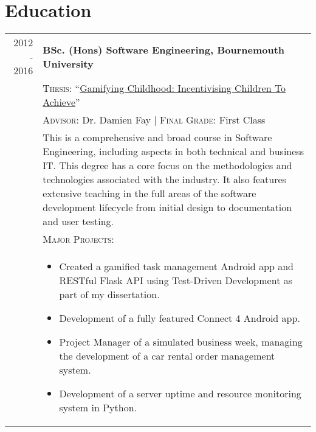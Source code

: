 \section{Education}
\begin{tabular}{r|p{11cm}}
	2012 - 2016 & \textbf{BSc. (Hons) Software Engineering, Bournemouth University}\\ 
	& \textsc{Thesis}: ``\href{https://github.com/mikeporterdev/Dissertation/blob/master/digitalmain.pdf}{Gamifying Childhood: Incentivising Children To Achieve}'' \\
	& \textsc{Advisor}: Dr. Damien Fay | \normalsize \textsc{Final Grade}: First Class \\
	& \small This is a comprehensive and broad course in Software Engineering, including aspects in both technical and business IT. This degree has a core focus on the methodologies and technologies associated with the industry. It also features extensive teaching in the full areas of the software development lifecycle from initial design to documentation and user testing. \\
	& \vspace{1pt} \textsc{Major Projects}: \\
	& \vspace{-0.9em}\begin{itemize}[itemsep=0pt,topsep=0pt,leftmargin=*]\small
	\item Created a gamified task management Android app and RESTful Flask API using Test-Driven Development as part of my dissertation.
	\item Development of a fully featured Connect 4 Android app. 
	\item Project Manager of a simulated business week, managing the development of a car rental order management system.
	\item Development of a server uptime and resource monitoring system in Python.
	\end{itemize}\vspace{-1.5em}

\end{tabular}